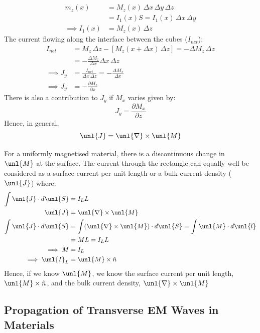 \documentclass[a4paper, 11pt, normalem]{report}
\newcommand\p{\partial}
\newcommand\del{\unl{\nabla}}
\newcommand\hn{\hat{n}}
\newcommand\J{\unl{J}}
\newcommand\M{\unl{M}}
\begin{document}
\chapter{}
\begin{align}
    m_z(x) &= M_z(x)\,\Delta x\,\Delta y\,\Delta z \\
    &= I_1(x)S = I_1(x)\,\Delta x\,\Delta y \\
    \implies I_1(x) &= M_z(x)\,\Delta z
\end{align}
The current flowing along the interface between the cubes ($I_{net}$):
\begin{align}
    I_{net} &= M_z\,\Delta z - [M_z(x + \Delta x)\,\Delta z] = -\Delta M_z\,\Delta z \\
    &= -\frac{\Delta M_z}{\Delta x} \Delta x\, \Delta z \\
    \implies J_y &= \frac{I_{net}}{\Delta x\,\Delta z} = - \frac{\Delta M_z}{\Delta x} \\
    \implies J_y &= -\frac{\p M_z}{\p x}
\end{align}
There is also a contribution to $J_y$ if $M_x$ varies given by:
\begin{equation}
    J_y = \frac{\p M_x}{\p z}
\end{equation}
Hence, in general,
\begin{equation}
    \J = \del \times \unl{M}
\end{equation}

For a uniformly magnetised material, there is a discontinuous change in $\unl{M}$ at the surface.
The current through the rectangle can equally well be considered as a surface current per unit length or a bulk current density ($\J$) where:
\begin{align}
    \int \J\cdot d\unl{S} &= I_LL \\
    \J &= \del \times \unl{M} \\
    \int \J\cdot d\unl{S} &= \int (\del\times\unl{M})\cdot d\unl{S} = \int \unl{M}\cdot d\unl{l} \\
    &= ML = I_LL \\
    \implies M &= I_L \\
    \implies \unl{I}_L &= \unl{M}\times\hn
\end{align}
Hence, if we know $\unl{M}$, we know the surface current per unit length, $\M \times \hn$, and the bulk current density, $\del\times\M$

\section{Propagation of Transverse EM Waves in Materials}
\end{document}
